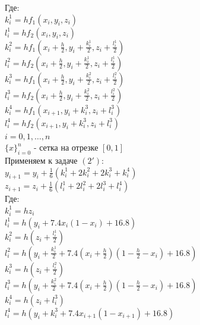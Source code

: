 \documentclass[12pt,a4paper]{article}
\begin{document}
        \noindent
        Где:\\
        $k_{i}^{1} = hf_{1}(x_{i}, y_{i}, z_{i})$\\
        $l_{i}^{1} = hf_{2}(x_{i}, y_{i}, z_{i})$\\
        $k_{i}^{2} = hf_{1}(x_{i} + \frac{h}{2}, y_{i} + \frac{k_{i}^{1}}{2},
            z_{i} + \frac{l_{i}^{1}}{2})$\\
        $l_{i}^{2} = hf_{2}(x_{i} + \frac{h}{2}, y_{i} + \frac{k_{i}^{1}}{2},
            z_{i} + \frac{l_{i}^{1}}{2})$\\
        $k_{i}^{3} = hf_{1}(x_{i} + \frac{h}{2}, y_{i} + \frac{k_{i}^{2}}{2},
            z_{i} + \frac{l_{i}^{2}}{2})$\\
        $l_{i}^{3} = hf_{2}(x_{i} + \frac{h}{2}, y_{i} + \frac{k_{i}^{2}}{2},
            z_{i} + \frac{l_{i}^{2}}{2})$\\
        $k_{i}^{4} = hf_{1}(x_{i+1}, y_{i} + k_{i}^{3}, z_{i} + l_{i}^{3})$\\
        $l_{i}^{4} = hf_{2}(x_{i+1}, y_{i} + k_{i}^{3}, z_{i} + l_{i}^{3})$\\
        $i = 0, 1, \dotsc, n$\\
        $\{x\}_{i=0}^n$ - сетка на отрезке $[0, 1]$\\
        
        \vspace{2mm}
        \noindent
        Применяем к задаче $(2')$:\\
        $y_{i+1} = y_{i} + \frac{1}{6}(k_{i}^{1} +2k_{i}^{2} + 2k_{i}^3 + k_{i}^4)$\\
        $z_{i+1} = z_{i} + \frac{1}{6}(l_{i}^{1} +2l_{i}^{2} + 2l_{i}^3 + l_{i}^4)$\\
        Где:\\
        $k_{i}^{1} = hz_{i}$\\
        $l_{i}^{1} = h(y_{i} + 7.4x_{i}(1 - x_{i}) + 16.8)$\\
        $k_{i}^{2} = h(z_{i} + \frac{l_{i}^{1}}{2})$\\
        $l_{i}^{2} = h(y_{i} + \frac{k_{i}^{1}}{2} + 7.4(x_{i} + \frac{h}{2})
            (1 - \frac{h}{2} - x_{i}) + 16.8)$\\
        $k_{i}^{3} = h(z_{i} + \frac{l_{i}^{2}}{2})$\\
        $l_{i}^{3} = h(y_{i} + \frac{k_{i}^{2}}{2} + 7.4(x_{i} + \frac{h}{2})
            (1 - \frac{h}{2} - x_{i}) + 16.8)$\\
        $k_{i}^{4} = h(z_{i} + l_{i}^{3})$\\
        $l_{i}^{4} = h(y_{i} + k_{i}^{3} + 7.4x_{i+1}(1 - x_{i+1}) + 16.8)$\\
        
\end{document}
